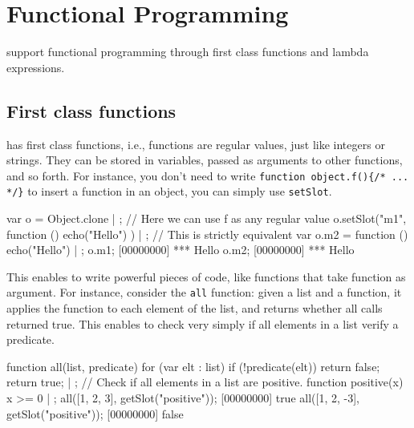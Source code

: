 
\chapter{Functional Programming}
\label{sec:tut:functional}

\us support functional programming through first class functions and
lambda expressions.

\section{First class functions}

\us has first class functions, i.e., functions are regular values,
just like integers or strings. They can be stored in variables,  passed
as arguments to other functions, and so forth. For instance, you don't need
to write
\lstinline|function object.f(){/* ... */}| to insert a function in an
object, you can simply use \lstinline{setSlot}.

\begin{urbiscript}[firstnumber=1]
var o = Object.clone | {};
// Here we can use f as any regular value
o.setSlot("m1", function () { echo("Hello") }) | {};
// This is strictly equivalent
var o.m2 = function () { echo("Hello") } | {};
o.m1;
[00000000] *** Hello
o.m2;
[00000000] *** Hello
\end{urbiscript}

This enables to write powerful pieces of code, like functions that
take function as argument. For instance, consider the \lstinline{all}
function: given a list and a function, it applies the function to each
element of the list, and returns whether all calls returned true. This
enables to check very simply if all elements in a list verify a
predicate.

\begin{urbiscript}
function all(list, predicate)
{
  for (var elt : list)
    if (!predicate(elt))
      return false;
  return true;
} | {};
// Check if all elements in a list are positive.
function positive(x) { x >= 0 } | {};
all([1, 2, 3], getSlot("positive"));
[00000000] true
all([1, 2, -3], getSlot("positive"));
[00000000] false
\end{urbiscript}

